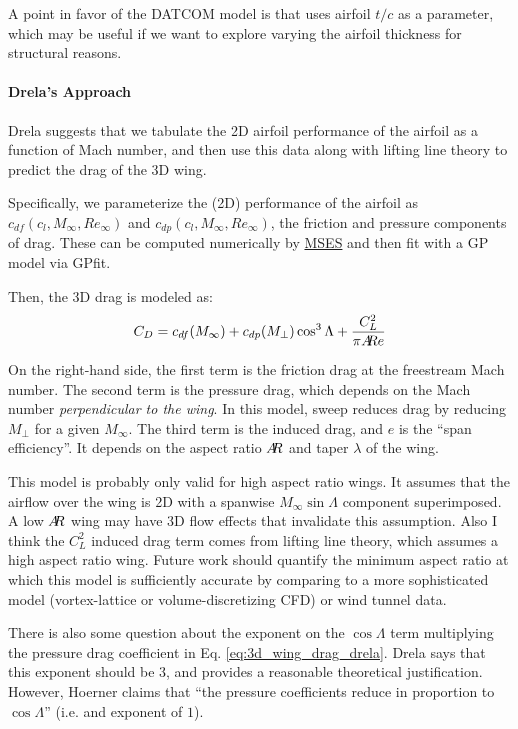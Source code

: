\documentclass[12pt]{article}
\newcommand{\ar}{A\mkern-6mu R}
\begin{document}
A point in favor of the DATCOM model is that uses airfoil $t/c$ as a parameter, which may be useful if we want to explore varying the airfoil thickness for structural reasons. 

\paragraph{Drela's Approach}
Drela \cite{Drela2014} suggests that we tabulate the 2D airfoil performance of the airfoil as a function of Mach number, and then use this data along with lifting line theory to predict the drag of the 3D wing.

Specifically, we parameterize the (2D) performance of the airfoil as $c_{df}(c_l, M_\infty, Re_\infty)$ and $c_{dp}(c_l, M_\infty, Re_\infty)$, the friction and pressure components of drag. These can be computed numerically by \href{http://web.mit.edu/drela/Public/web/mses/}{MSES} and then fit with a GP model via GPfit.

Then, the 3D drag is modeled as:
\begin{equation}
\label{eq:3d_wing_drag_drela}
C_D = c_{df}(M_\infty) + c_{dp}(M_\perp) \cos^3\Lambda + \frac{C_L^2}{\pi \ar e}
\end{equation}

On the right-hand side, the first term is the friction drag at the freestream Mach number. The second term is the pressure drag, which depends on the Mach number \emph{perpendicular to the wing}. In this model, sweep reduces drag by reducing $M_\perp$ for a given $M_\infty$. The third term is the induced drag, and $e$ is the ``span efficiency''. It depends on the aspect ratio $\ar$ and taper $\lambda$ of the wing.

This model is probably only valid for high aspect ratio wings. It assumes that the airflow over the wing is 2D with a spanwise $M_\infty \sin\Lambda$ component superimposed. A low $\ar$ wing may have 3D flow effects that invalidate this assumption.
Also I think the $C_L^2$ induced drag term comes from lifting line theory, which assumes a high aspect ratio wing.
Future work should quantify the minimum aspect ratio at which this model is sufficiently accurate by comparing to  a more sophisticated model (vortex-lattice or volume-discretizing CFD) or wind tunnel data.

There is also some question about the exponent on the $\cos \Lambda$ term multiplying the pressure drag coefficient in Eq. \ref{eq:3d_wing_drag_drela}. Drela \cite{Drela2014} says that this exponent should be $3$, and provides a reasonable theoretical justification. However, Hoerner \cite{Hoerner1965} claims that ``the pressure coefficients reduce in proportion to $\cos \Lambda$'' (i.e. and exponent of $1$).
\end{document}
